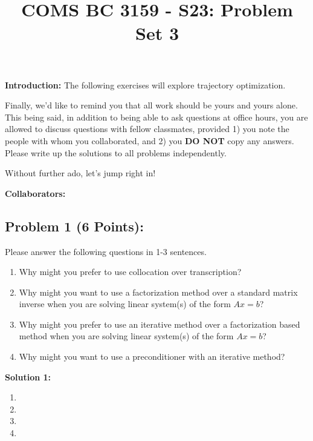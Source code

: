 \documentclass[]{article}
\title{COMS BC 3159 - S23: Problem Set 3}
\author{
}
\date{}
\begin{document}
\maketitle

\textbf{Introduction:}  
The following exercises will explore trajectory optimization.

Finally, we'd like to remind you that all work should be yours and yours alone. This being said, in addition to being able to ask questions at office hours, you are allowed to discuss questions with fellow classmates, provided 1) you note the people with whom you collaborated, and 2) you \textbf{DO NOT} copy any answers. Please write up the solutions to all problems independently.

Without further ado, let's jump right in!

\bigskip
\textbf{Collaborators:}
\clearpage

\subsection*{Problem 1 (6 Points):}
Please answer the following questions in 1-3 sentences.
\begin{enumerate}[label=(\alph*)]
    \item Why might you prefer to use collocation over transcription?
    \item Why might you want to use a factorization method over a standard matrix inverse when you are solving linear system(s) of the form $Ax=b$?
    \item Why might you prefer to use an iterative method over a factorization based method when you are solving linear system(s) of the form $Ax=b$?
    \item Why might you want to use a preconditioner with an iterative method?
\end{enumerate}

\textbf{Solution 1:}
\begin{enumerate}[label=(\alph*)]
    \item %
    \item %
    \item %
    \item %
\end{enumerate}
\end{document}
